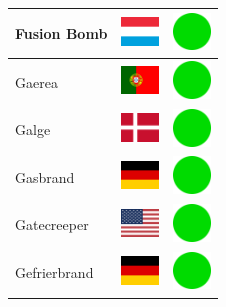 \documentclass[12pt, a4paper, twoside]{report}
\begin{document}
\begin{center}
\begin{longtable}{|p{5cm}|p{2cm}|p{2cm}|}
 Fusion Bomb                                                & \includegraphics[width=1cm]{../img/flags/lu} &   \includegraphics[width=1cm]{../likes/y} \\ \hline
 Gaerea                                                     & \includegraphics[width=1cm]{../img/flags/pt} &   \includegraphics[width=1cm]{../likes/y} \\ \hline
 Galge                                                      & \includegraphics[width=1cm]{../img/flags/dk} &   \includegraphics[width=1cm]{../likes/y} \\ \hline
 Gasbrand                                                   & \includegraphics[width=1cm]{../img/flags/de} &   \includegraphics[width=1cm]{../likes/y} \\ \hline
 Gatecreeper                                                & \includegraphics[width=1cm]{../img/flags/us} &   \includegraphics[width=1cm]{../likes/y} \\ \hline
 Gefrierbrand                                               & \includegraphics[width=1cm]{../img/flags/de} &   \includegraphics[width=1cm]{../likes/y} \\ \hline

\end{longtable}
\end{center}
\end{document}
